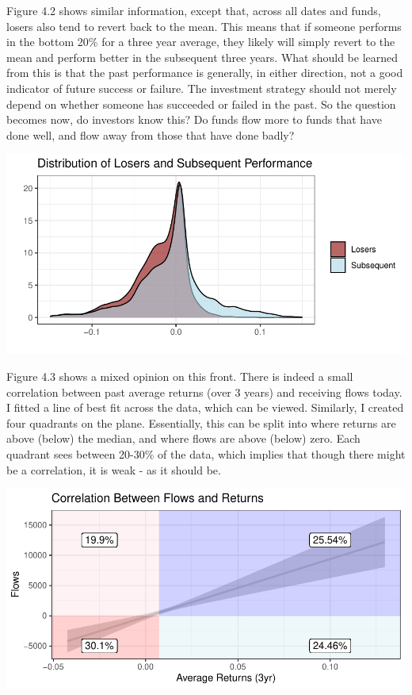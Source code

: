 \documentclass[11pt,preprint, authoryear]{elsarticle}
\let\origfigure\figure
\let\endorigfigure\endfigure
\renewenvironment{figure}[1][2] {
    \expandafter\origfigure\expandafter[H]
} {
    \endorigfigure
}
\numberwithin{equation}{section}
\numberwithin{figure}{section}
\numberwithin{table}{section}
\begin{document}
Figure 4.2 shows similar information, except that, across all dates and
funds, losers also tend to revert back to the mean. This means that if
someone performs in the bottom 20\% for a three year average, they
likely will simply revert to the mean and perform better in the
subsequent three years. What should be learned from this is that the
past performance is generally, in either direction, not a good indicator
of future success or failure. The investment strategy should not merely
depend on whether someone has succeeded or failed in the past. So the
question becomes now, do investors know this? Do funds flow more to
funds that have done well, and flow away from those that have done
badly?

\begin{figure}[H]

{\centering \includegraphics{Question-4_files/figure-latex/unnamed-chunk-2-1} 

}

\caption{ \label{Figure4.2}}\label{fig:unnamed-chunk-2}
\end{figure}

Figure 4.3 shows a mixed opinion on this front. There is indeed a small
correlation between past average returns (over 3 years) and receiving
flows today. I fitted a line of best fit across the data, which can be
viewed. Similarly, I created four quadrants on the plane. Essentially,
this can be split into where returns are above (below) the median, and
where flows are above (below) zero. Each quadrant sees between 20-30\%
of the data, which implies that though there might be a correlation, it
is weak - as it should be.

\begin{figure}[H]

{\centering \includegraphics{Question-4_files/figure-latex/unnamed-chunk-3-1} 

}

\caption{ \label{Figure4.3}}\label{fig:unnamed-chunk-3}
\end{figure}


\end{document}
